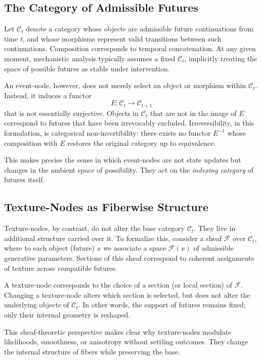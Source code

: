 \documentclass[11pt]{article}
\begin{document}
\subsection{The Category of Admissible Futures}

Let $\mathcal{C}_t$ denote a category whose objects are admissible future
continuations from time $t$, and whose morphisms represent valid transitions
between such continuations. Composition corresponds to temporal concatenation.
At any given moment, mechanistic analysis typically assumes a fixed
$\mathcal{C}_t$, implicitly treating the space of possible futures as stable
under intervention.

An event-node, however, does not merely select an object or morphism within
$\mathcal{C}_t$. Instead, it induces a functor
\[
E : \mathcal{C}_t \longrightarrow \mathcal{C}_{t+1}
\]
that is not essentially surjective. Objects in $\mathcal{C}_t$ that are not in
the image of $E$ correspond to futures that have been irrevocably excluded.
Irreversibility, in this formulation, is categorical non-invertibility: there
exists no functor $E^{-1}$ whose composition with $E$ restores the original
category up to equivalence.

This makes precise the sense in which event-nodes are not state updates but
changes in the ambient space of possibility. They act on the \emph{indexing
category} of futures itself.

\subsection{Texture-Nodes as Fiberwise Structure}

Texture-nodes, by contrast, do not alter the base category $\mathcal{C}_t$. They
live in additional structure carried over it. To formalize this, consider a
sheaf $\mathcal{F}$ over $\mathcal{C}_t$, where to each object (future) $x$ we
associate a space $\mathcal{F}(x)$ of admissible generative parameters. Sections
of this sheaf correspond to coherent assignments of texture across compatible
futures.

A texture-node corresponds to the choice of a section (or local section) of
$\mathcal{F}$. Changing a texture-node alters which section is selected, but
does not alter the underlying objects of $\mathcal{C}_t$. In other words, the
support of futures remains fixed; only their internal geometry is reshaped.

This sheaf-theoretic perspective makes clear why texture-nodes modulate
likelihoods, smoothness, or anisotropy without settling outcomes. They change
the internal structure of fibers while preserving the base.
\end{document}
